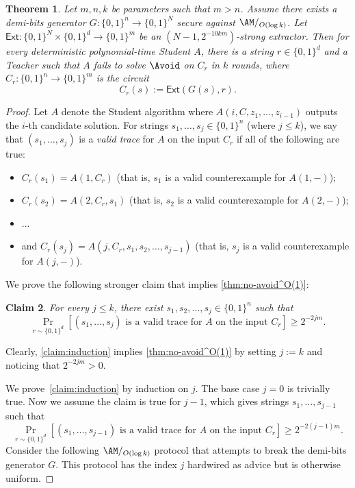 \documentclass[10pt,a4paper]{article}
\newtheorem{theorem}{Theorem}[section]
\newtheorem{claim}[theorem]{Claim}
\theoremstyle{definition}
\theoremstyle{remark}
\newcommand{\Ext}{\mathsf{Ext}}
\newenvironment{compactitem}{\begin{itemize}}{\end{itemize}}
\begin{document}
\begin{theorem}\label{thm:no-avoid^O(1)}
    Let $m, n, k$ be parameters such that $m > n$. Assume there exists a demi-bits generator $G: \{0,1\}^n \to \{0,1\}^N$ secure against $\AM/_{O(\log k)}$. Let $\Ext: \{0,1\}^N \times \{0,1\}^d \to \{0,1\}^m$ be an $(N-1, 2^{-10km})$-strong extractor. Then for every deterministic polynomial-time Student $A$, there is a string $r\in \{0,1\}^d$ and a Teacher such that $A$ fails to solve $\Avoid$ on $C_r$ in $k$ rounds, where $C_r: \{0,1\}^n \to \{0,1\}^m$ is the circuit
    \[C_r(s) := \Ext(G(s), r).\]
\end{theorem}
\begin{proof}
    Let $A$ denote the Student algorithm where $A(i, C, z_1, \dots, z_{i-1})$ outputs the $i$-th candidate solution. For strings $s_1, \dots, s_j\in \{0,1\}^n$ (where $j\le k$), we say that $(s_1, \dots, s_j)$ is a \emph{valid trace} for $A$ on the input $C_r$ if all of the following are true:
    \begin{compactitem}
        \item $C_r(s_1) = A(1, C_r)$ (that is, $s_1$ is a valid counterexample for $A(1, -)$);
        \item $C_r(s_2) = A(2, C_r, s_1)$ (that is, $s_2$ is a valid counterexample for $A(2, -)$);
        \item $\dots$
        \item and $C_r(s_j) = A(j, C_r, s_1, s_2, \dots, s_{j-1})$ (that is, $s_j$ is a valid counterexample for $A(j, -)$).
    \end{compactitem}
    
    We prove the following stronger claim that implies \autoref{thm:no-avoid^O(1)}:
    
    \begin{claim}\label{claim:induction}
        For every $j\le k$, there exist $s_1, s_2, \dots, s_j \in \{0,1\}^n$ such that
        \[\Pr_{r\sim \{0,1\}^d}[(s_1, \dots, s_j)\text{ is a valid trace for $A$ on the input $C_r$}] \ge 2^{-2jm}.\]
    \end{claim}
    Clearly, \autoref{claim:induction} implies \autoref{thm:no-avoid^O(1)} by setting $j := k$ and noticing that $2^{-2jm} > 0$.

    We prove~\autoref{claim:induction} by induction on $j$. The base case $j=0$ is trivially true. Now we assume the claim is true for $j-1$, which gives strings $s_1,\dots,s_{j-1}$ such that
    \[\Pr_{r\sim \{0,1\}^d}[(s_1, \dots, s_{j-1})\text{ is a valid trace for $A$ on the input $C_r$}] \ge 2^{-2(j-1)m}.\]
    Consider the following $\AM/_{O(\log k)}$ protocol that attempts to break the demi-bits generator $G$. This protocol has the index $j$ hardwired as advice but is otherwise uniform.



\end{proof}
\end{document}
